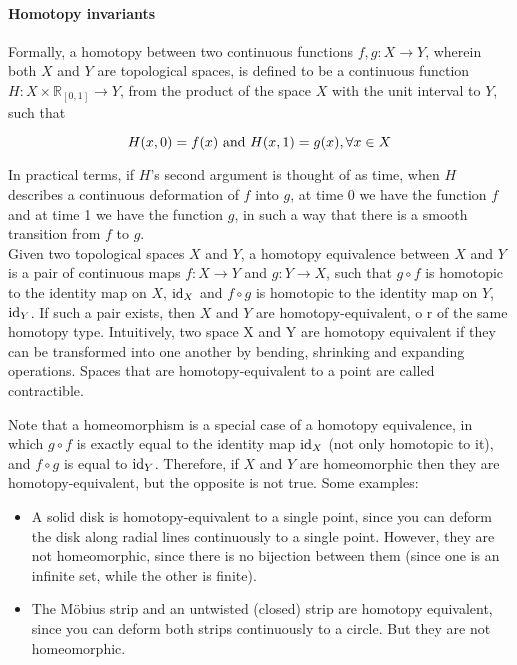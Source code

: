 \documentclass{homework}
\begin{document}
\paragraph{\textbf{Homotopy invariants}}

Formally, a homotopy between two continuous functions $f, g: X \to Y$, wherein both $X$ and $Y$ are topological spaces, is defined to be a continuous function $H: X \times \mathds{R}_{[0,1]} \to Y$, from the product of the space $X$ with the unit interval to $Y$, such that 

$$
    H(x,0) = f(x) \textnormal{ and } H(x, 1) = g(x), \forall x \in X 
$$

In practical terms, if $H$'s second argument is thought of as time, when $H$ describes a continuous deformation of $f$ into $g$, at time 0 we have the function $f$ and at time 1 we have the function $g$, in such a way that there is a smooth transition from $f$ to $g$. \\

Given two topological spaces $X$ and $Y$, a homotopy equivalence between $X$ and $Y$ is a pair of continuous maps $f: X \to Y$ and $g: Y \to X$, such that $ g \circ f $ is homotopic to the identity map on $X$, $\textnormal{id}_X$ and $ f \circ g $ is homotopic to the identity map on $Y$, $\textnormal{id}_Y$. If such a pair exists, then $X$ and $Y$ are homotopy-equivalent, o r of the same homotopy type. Intuitively, two space X and Y are homotopy equivalent if they can be transformed into one another by bending, shrinking and expanding operations. Spaces that are homotopy-equivalent to a point are called contractible.

Note that a homeomorphism is a special case of a homotopy equivalence, in which $g \circ f$ is exactly equal to the identity map $\textnormal{id}_X$ (not only homotopic to it), and $f \circ g$ is equal to $\textnormal{id}_Y$. Therefore, if $X$ and $Y$ are homeomorphic then they are homotopy-equivalent, but the opposite is not true. Some examples:

\begin{itemize}
    \item A solid disk is homotopy-equivalent to a single point, since you can deform the disk along radial lines continuously to a single point. However, they are not homeomorphic, since there is no bijection between them (since one is an infinite set, while the other is finite).
    \item The Möbius strip and an untwisted (closed) strip are homotopy equivalent, since you can deform both strips continuously to a circle. But they are not homeomorphic. \\
\end{itemize}
\end{document}
